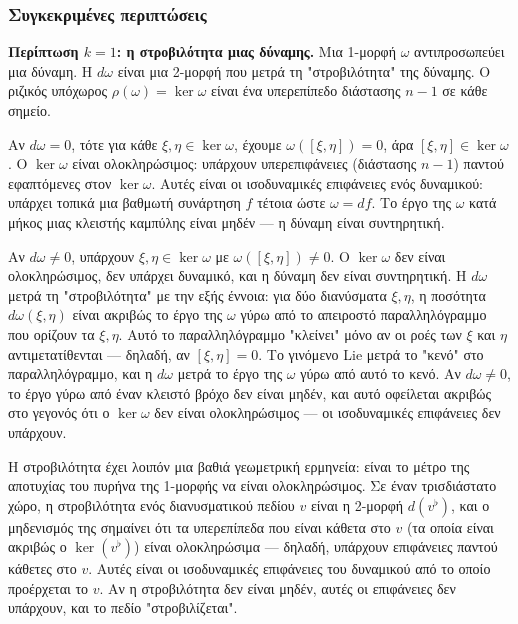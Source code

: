 \documentclass[12pt]{article}
\begin{document}
\subsubsection{Συγκεκριμένες περιπτώσεις}

\textbf{Περίπτωση $k=1$: η στροβιλότητα μιας δύναμης.} Μια 1-μορφή $\omega$ αντιπροσωπεύει μια δύναμη. Η $d\omega$ είναι μια 2-μορφή που μετρά τη "στροβιλότητα" της δύναμης. Ο ριζικός υπόχωρος $\rho(\omega) = \ker \omega$ είναι ένα υπερεπίπεδο διάστασης $n-1$ σε κάθε σημείο.

Αν $d\omega = 0$, τότε για κάθε $\xi, \eta \in \ker \omega$, έχουμε $\omega([\xi, \eta]) = 0$, άρα $[\xi, \eta] \in \ker \omega$. Ο $\ker \omega$ είναι ολοκληρώσιμος: υπάρχουν υπερεπιφάνειες (διάστασης $n-1$) παντού εφαπτόμενες στον $\ker \omega$. Αυτές είναι οι ισοδυναμικές επιφάνειες ενός δυναμικού: υπάρχει τοπικά μια βαθμωτή συνάρτηση $f$ τέτοια ώστε $\omega = df$. Το έργο της $\omega$ κατά μήκος μιας κλειστής καμπύλης είναι μηδέν — η δύναμη είναι συντηρητική.

Αν $d\omega \neq 0$, υπάρχουν $\xi, \eta \in \ker \omega$ με $\omega([\xi, \eta]) \neq 0$. Ο $\ker \omega$ δεν είναι ολοκληρώσιμος, δεν υπάρχει δυναμικό, και η δύναμη δεν είναι συντηρητική. Η $d\omega$ μετρά τη "στροβιλότητα" με την εξής έννοια: για δύο διανύσματα $\xi, \eta$, η ποσότητα $d\omega(\xi, \eta)$ είναι ακριβώς το έργο της $\omega$ γύρω από το απειροστό παραλληλόγραμμο που ορίζουν τα $\xi, \eta$. Αυτό το παραλληλόγραμμο "κλείνει" μόνο αν οι ροές των $\xi$ και $\eta$ αντιμετατίθενται — δηλαδή, αν $[\xi, \eta] = 0$. Το γινόμενο Lie μετρά το "κενό" στο παραλληλόγραμμο, και η $d\omega$ μετρά το έργο της $\omega$ γύρω από αυτό το κενό. Αν $d\omega \neq 0$, το έργο γύρω από έναν κλειστό βρόχο δεν είναι μηδέν, και αυτό οφείλεται ακριβώς στο γεγονός ότι ο $\ker \omega$ δεν είναι ολοκληρώσιμος — οι ισοδυναμικές επιφάνειες δεν υπάρχουν.

Η στροβιλότητα έχει λοιπόν μια βαθιά γεωμετρική ερμηνεία: είναι το μέτρο της αποτυχίας του πυρήνα της 1-μορφής να είναι ολοκληρώσιμος. Σε έναν τρισδιάστατο χώρο, η στροβιλότητα ενός διανυσματικού πεδίου $v$ είναι η 2-μορφή $d(v^\flat)$, και ο μηδενισμός της σημαίνει ότι τα υπερεπίπεδα που είναι κάθετα στο $v$ (τα οποία είναι ακριβώς ο $\ker(v^\flat)$) είναι ολοκληρώσιμα — δηλαδή, υπάρχουν επιφάνειες παντού κάθετες στο $v$. Αυτές είναι οι ισοδυναμικές επιφάνειες του δυναμικού από το οποίο προέρχεται το $v$. Αν η στροβιλότητα δεν είναι μηδέν, αυτές οι επιφάνειες δεν υπάρχουν, και το πεδίο "στροβιλίζεται".
\end{document}
